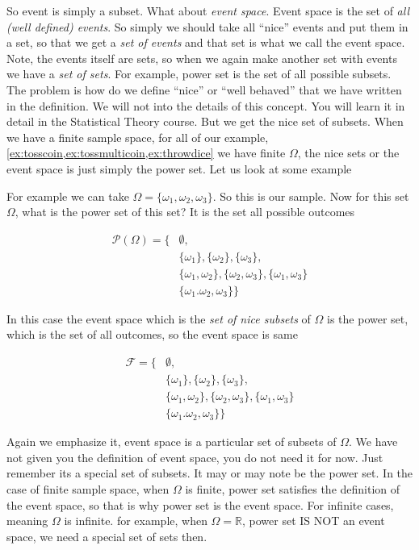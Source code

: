 \documentclass[ 11pt,%
				a4paper,%
				oneside,%
				headinclude,%
				footinclude = true,%
				cleardoublepage = empty,%
				reqno]{scrbook}
\begin{document}
		So event is simply a subset. What about \emph{event space}. Event space is the set of \emph{all (well defined) events}. So simply we should take all ``nice'' events and put them in a set, so that we get a \emph{set of events} and that set is what we call the event space. Note, the events itself are sets, so when we again make another set with events we have a \emph{set of sets}. For example, power set is the set of all possible subsets. The problem is how do we define ``nice'' or ``well behaved'' that we have written in the definition. We will not into the details of this concept. You will learn it in detail in the Statistical Theory course. But we get the nice set of subsets. When we have a finite sample space, for all of our example, \cref{ex:tosscoin,ex:tossmulticoin,ex:throwdice} we have finite $\Omega$, the nice sets or the event space is just simply the power set. Let us look at some example

		\begin{example}
		For example we can take $\Omega = \{\omega_1, \omega_2, \omega_3 \}$. So this is our sample. Now for this set $\Omega$, what is the power set of this set? It is the set all possible outcomes

		\begin{align*}
			\mathscr{P}(\Omega) =\{ & \emptyset, \\
								 & \{ \omega_1 \}, \{ \omega_2 \}, \{ \omega_3 \}, \\
								 & \{ \omega_1, \omega_2 \}, \{ \omega_2, \omega_3 \}, \{ \omega_1, \omega_3 \}\\
								 & \{ \omega_1. \omega_2, \omega_3\} \}
		\end{align*}


		In this case the event space which is the \emph{set of nice subsets} of $\Omega$ is the power set, which is the set of all outcomes, so the event space is same 

		\begin{align*}
			\mathcal{F} =\{ & \emptyset, \\
							 & \{ \omega_1 \}, \{ \omega_2 \}, \{ \omega_3 \}, \\
							 & \{ \omega_1, \omega_2 \}, \{ \omega_2, \omega_3 \}, \{ \omega_1, \omega_3 \}\\
							 & \{ \omega_1. \omega_2, \omega_3\} \}
		\end{align*}
			
		\end{example}


		Again we emphasize it, event space is a particular set of subsets of $\Omega$. We have not given you the definition of event space, you do not need it for now. Just remember its a special set of subsets. It may or may note be the power set. In the case of finite sample space, when $\Omega$ is finite, power set satisfies the definition of the event space, so that is why power set is the event space. For infinite cases, meaning $\Omega$ is infinite. for example, when $\Omega = \mathbb{R}$, power set IS NOT an event space, we need a special set of sets then. 
\end{document}
